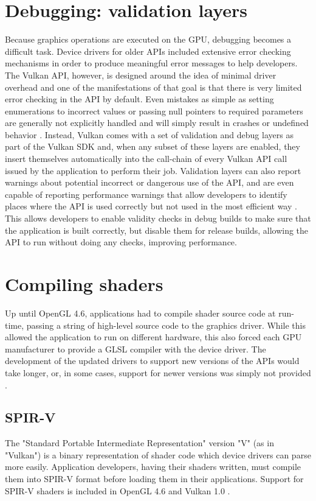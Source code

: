 \section{Debugging: validation layers}
Because graphics operations are executed on the GPU, debugging becomes a difficult task. Device drivers for older APIs included extensive error checking mechanisms in order to produce meaningful error messages to help developers. The Vulkan API, however, is designed around the idea of minimal driver overhead and one of the manifestations of that goal is that there is very limited error checking in the API by default. Even mistakes as simple as setting enumerations to incorrect values or passing null pointers to required parameters are generally not explicitly handled and will simply result in crashes or undefined behavior \cite{vulkan_tutorial}. Instead, Vulkan comes with a set of validation and debug layers as part of the Vulkan SDK and, when any subset of these layers are enabled, they insert themselves automatically into the call-chain of every Vulkan API call issued by the application to perform their job. Validation layers can also report warnings about potential incorrect or dangerous use of the API, and are even capable of reporting performance warnings that allow developers to identify places where the API is used correctly but not used in the most efficient way \cite{vulkan_validation_layers}. This allows developers to enable validity checks in debug builds to make sure that the application is built correctly, but disable them for release builds, allowing the API to run without doing any checks, improving performance.

\section{Compiling shaders}
Up until OpenGL 4.6, applications had to compile shader source code at run-time, passing a string of high-level source code to the graphics driver. While this allowed the application to run on different hardware, this also forced each GPU manufacturer to provide a GLSL compiler with the device driver. The development of the updated drivers to support new versions of the APIs would take longer, or, in some cases, support for newer versions was simply not provided \cite{apple_nopengl}.

\subsection{SPIR-V}
The "Standard Portable Intermediate Representation" version "V" (as in "Vulkan") is a binary representation of shader code which device drivers can parse more easily. Application developers, having their shaders written, must compile them into SPIR-V format before loading them in their applications. Support for SPIR-V shaders is included in OpenGL 4.6 and Vulkan 1.0 \cite{spirv_spec}.

